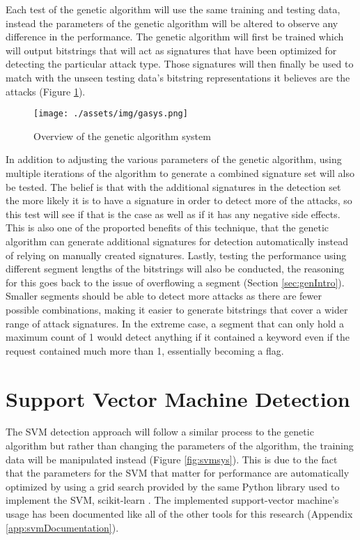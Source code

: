Each test of the genetic algorithm will use the same training and testing data, instead the parameters of the genetic algorithm will be altered to observe any difference in the performance.  The genetic algorithm will first be trained which will output bitstrings that will act as signatures that have been optimized for detecting the particular attack type. Those signatures will then finally be used to match with the unseen testing data's bitstring representations it believes are the attacks (Figure \ref{fig:gasys}).

\begin{figure}
	\texttt{[image: ./assets/img/gasys.png]}
	\caption{Overview of the genetic algorithm system}
	\label{fig:gasys}
\end{figure}

In addition to adjusting the various parameters of the genetic algorithm, using multiple iterations of the algorithm to generate a combined signature set will also be tested.  The belief is that with the additional signatures in the detection set the more likely it is to have a signature in order to detect more of the attacks, so this test will see if that is the case as well as if it has any negative side effects.  This is also one of the proported benefits of this technique, that the genetic algorithm can generate additional signatures for detection automatically instead of relying on manually created signatures.  Lastly, testing the performance using different segment lengths of the bitstrings will also be conducted, the reasoning for this goes back to the issue of overflowing a segment (Section \ref{sec:genIntro}).  Smaller segments should be able to detect more attacks as there are fewer possible combinations, making it easier to generate bitstrings that cover a wider range of attack signatures.  In the extreme case, a segment that can only hold a maximum count of 1 would detect anything if it contained a keyword even if the request contained much more than 1, essentially becoming a flag.

\section{Support Vector Machine Detection}

The SVM detection approach will follow a similar process to the genetic algorithm but rather than changing the parameters of the algorithm, the training data will be manipulated instead (Figure \ref{fig:svmsys}).  This is due to the fact that the parameters for the SVM that matter for performance are automatically optimized by using a grid search provided by the same Python library used to implement the SVM, scikit-learn \cite{scikit-learn}.  The implemented support-vector machine's usage has been documented like all of the other tools for this research (Appendix \ref{app:svmDocumentation}).

